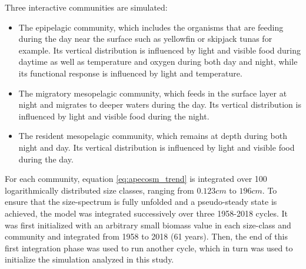 %
%

Three interactive communities are simulated:
\begin{itemize}
\item{The epipelagic community, which includes the organisms that are feeding during the day near the surface such as yellowfin or skipjack tunas for example. Its vertical distribution is influenced by light and visible food during daytime as well as temperature and oxygen during both day and night, while its functional response is influenced by light and temperature.}
\item{The migratory mesopelagic community, which feeds in the surface layer at night and migrates to deeper waters during the day. Its vertical distribution is influenced by light and visible food during the night.}
\item{The resident mesopelagic community, which remains at depth during both night and day. Its vertical distribution is influenced by light and visible food during the day.}
\end{itemize}

For each community, equation \ref{eq:apecosm_trend} is integrated over 100 logarithmically distributed size classes, ranging from $0.123cm$ to $196cm$. To ensure that the size-spectrum is fully unfolded and a pseudo-steady state is achieved, the model was integrated successively over three 1958-2018 cycles. It was first initialized with an arbitrary small biomass value in each size-class and community and integrated from 1958 to 2018 (61 years). Then, the end of this first integration phase was used to run another cycle, which in turn was used to initialize the simulation analyzed in this study.

